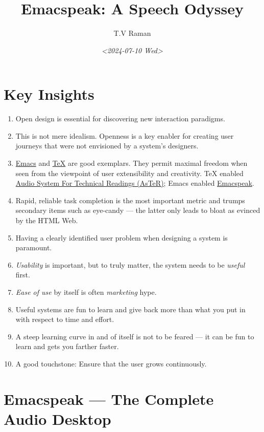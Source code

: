 \documentclass[11pt]{article}
\author{T.V Raman}
\date{\textit{<2024-07-10 Wed>}}
\title{Emacspeak:  A Speech Odyssey}
\begin{document}
\maketitle
\tableofcontents

\section{Key Insights}
\label{sec:org11b3d5b}

\begin{enumerate}
\item Open design is essential  for discovering new interaction
paradigms.
\item This is not mere idealism.  Openness is a key enabler for
creating   user journeys that were not  envisioned by a 
system's designers.
\item \href{https://www.gnu.org/s/emacs/}{Emacs} and  \href{https://en.wikipedia.org/wiki/TeX}{\TeX{}}    are good exemplars. They  permit maximal freedom
 when seen from the viewpoint of user extensibility and
creativity. \TeX{} enabled \href{https://emacspeak.blogspot.com/2022/12/aster-spoken-math-on-emacspeak-audio\_21.html}{Audio System For Technical Readings (AsTeR)}; Emacs enabled \href{https://emacspeak.sourceforge.net}{Emacspeak}.
\item Rapid, reliable task completion is the most important metric and
trumps secondary items such as eye-candy --- the latter only
leads to bloat as evinced by the HTML Web.
\item Having a clearly identified user problem when designing a system
is paramount.
\item \emph{Usability} is important, but to  truly matter, the
system needs to be \emph{useful} first.
\item \emph{Ease of use} by   itself is often \emph{marketing} hype.
\item Useful systems are fun to learn and give back more than what you put
in with respect to time and effort.
\item A steep learning curve in and of itself is not to be feared --- it
can be fun to learn and  gets you farther faster.
\item A good touchstone: Ensure that the user grows continuously.
\end{enumerate}
\section{Emacspeak --- The Complete Audio Desktop}
\label{sec:org4f4cfa2}
\end{document}

